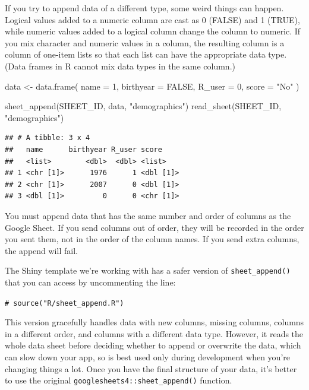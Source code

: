 \documentclass[
]{book}
\newenvironment{Shaded}{\begin{snugshade}}{\end{snugshade}}
\newcommand{\AttributeTok}[1]{\textcolor[rgb]{0.77,0.63,0.00}{#1}}
\newcommand{\ConstantTok}[1]{\textcolor[rgb]{0.00,0.00,0.00}{#1}}
\newcommand{\DecValTok}[1]{\textcolor[rgb]{0.00,0.00,0.81}{#1}}
\newcommand{\FunctionTok}[1]{\textcolor[rgb]{0.00,0.00,0.00}{#1}}
\newcommand{\NormalTok}[1]{#1}
\newcommand{\OtherTok}[1]{\textcolor[rgb]{0.56,0.35,0.01}{#1}}
\newcommand{\StringTok}[1]{\textcolor[rgb]{0.31,0.60,0.02}{#1}}
\begin{document}
If you try to append data of a different type, some weird things can happen. Logical values added to a numeric column are cast as 0 (FALSE) and 1 (TRUE), while numeric values added to a logical column change the column to numeric. If you mix character and numeric values in a column, the resulting column is a column of one-item lists so that each list can have the appropriate data type. (Data frames in R cannot mix data types in the same column.)

\begin{Shaded}
\begin{Highlighting}[]
\NormalTok{data }\OtherTok{\textless{}{-}} \FunctionTok{data.frame}\NormalTok{(}
  \AttributeTok{name =} \DecValTok{1}\NormalTok{,}
  \AttributeTok{birthyear =} \ConstantTok{FALSE}\NormalTok{,}
  \AttributeTok{R\_user =} \DecValTok{0}\NormalTok{,}
  \AttributeTok{score =} \StringTok{"No"}
\NormalTok{)}

\FunctionTok{sheet\_append}\NormalTok{(SHEET\_ID, data, }\StringTok{"demographics"}\NormalTok{)}
\FunctionTok{read\_sheet}\NormalTok{(SHEET\_ID, }\StringTok{"demographics"}\NormalTok{)}
\end{Highlighting}
\end{Shaded}

\begin{verbatim}
## # A tibble: 3 x 4
##   name      birthyear R_user score    
##   <list>        <dbl>  <dbl> <list>   
## 1 <chr [1]>      1976      1 <dbl [1]>
## 2 <chr [1]>      2007      0 <dbl [1]>
## 3 <dbl [1]>         0      0 <chr [1]>
\end{verbatim}

You must append data that has the same number and order of columns as the Google Sheet. If you send columns out of order, they will be recorded in the order you sent them, not in the order of the column names. If you send extra columns, the append will fail.

The Shiny template we're working with has a safer version of \texttt{sheet\_append()} that you can access by uncommenting the line:

\texttt{\#\ source("R/sheet\_append.R")}

This version gracefully handles data with new columns, missing columns, columns in a different order, and columns with a different data type. However, it reads the whole data sheet before deciding whether to append or overwrite the data, which can slow down your app, so is best used only during development when you're changing things a lot. Once you have the final structure of your data, it's better to use the original \texttt{googlesheets4::sheet\_append()} function.
\end{document}
